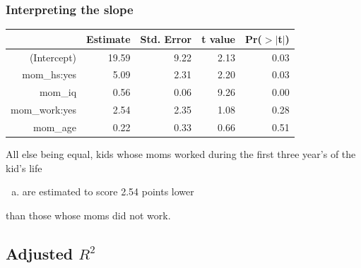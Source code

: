 
\begin{frame}
\frametitle{Interpreting the slope}


{\scriptsize
\begin{center}
\begin{tabular}{rrrrr}
  \hline
 & Estimate & Std. Error & t value & Pr($>$$|$t$|$) \\ 
  \hline
(Intercept) & 19.59 & 9.22 & 2.13 & 0.03 \\ 
  mom\_hs:yes & 5.09 & 2.31 & 2.20 & 0.03 \\ 
  mom\_iq & 0.56 & 0.06 & 9.26 & 0.00 \\ 
  mom\_work:yes & 2.54 & 2.35 & 1.08 & 0.28 \\ 
  mom\_age & 0.22 & 0.33 & 0.66 & 0.51 \\ 
   \hline
\end{tabular}
\end{center}
}

All else being equal, kids whose moms worked during the first three year's of the kid's life
\begin{enumerate}[(a)]
\item are estimated to score 2.54 points lower
\end{enumerate}
than those whose moms did not work.
 
\end{frame}


\subsection{Adjusted $R^2$}


